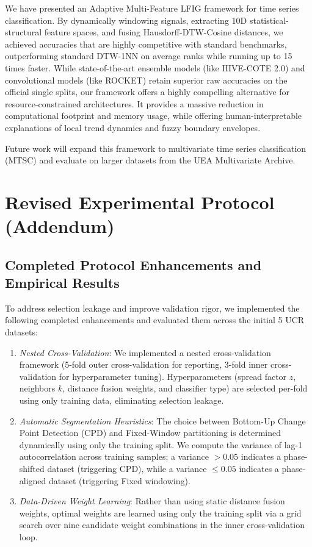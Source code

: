 \documentclass[conference]{IEEEtran}
\begin{document}
We have presented an Adaptive Multi-Feature LFIG framework for time series classification. By dynamically windowing signals, extracting 10D statistical-structural feature spaces, and fusing Hausdorff-DTW-Cosine distances, we achieved accuracies that are highly competitive with standard benchmarks, outperforming standard DTW-1NN on average ranks while running up to 15 times faster. While state-of-the-art ensemble models (like HIVE-COTE 2.0) and convolutional models (like ROCKET) retain superior raw accuracies on the official single splits, our framework offers a highly compelling alternative for resource-constrained architectures. It provides a massive reduction in computational footprint and memory usage, while offering human-interpretable explanations of local trend dynamics and fuzzy boundary envelopes.

Future work will expand this framework to multivariate time series classification (MTSC) and evaluate on larger datasets from the UEA Multivariate Archive.

\section{Revised Experimental Protocol (Addendum)}
\label{sec:revised_protocol}

\subsection{Completed Protocol Enhancements and Empirical Results}
To address selection leakage and improve validation rigor, we implemented the following completed enhancements and evaluated them across the initial 5 UCR datasets:
\begin{enumerate}
    \item \textit{Nested Cross-Validation}: We implemented a nested cross-validation framework (5-fold outer cross-validation for reporting, 3-fold inner cross-validation for hyperparameter tuning). Hyperparameters (spread factor $z$, neighbors $k$, distance fusion weights, and classifier type) are selected per-fold using only training data, eliminating selection leakage.
    \item \textit{Automatic Segmentation Heuristics}: The choice between Bottom-Up Change Point Detection (CPD) and Fixed-Window partitioning is determined dynamically using only the training split. We compute the variance of lag-1 autocorrelation across training samples; a variance $> 0.05$ indicates a phase-shifted dataset (triggering CPD), while a variance $\le 0.05$ indicates a phase-aligned dataset (triggering Fixed windowing).
    \item \textit{Data-Driven Weight Learning}: Rather than using static distance fusion weights, optimal weights are learned using only the training split via a grid search over nine candidate weight combinations in the inner cross-validation loop.
\end{enumerate}
\end{document}
